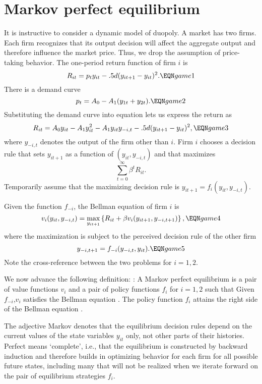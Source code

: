 \section{Markov perfect equilibrium}

It is instructive to consider a dynamic model of duopoly.
A  market has two firms. Each firm recognizes that its
output decision will affect the aggregate output and therefore influence the
market price. Thus, we drop the assumption of price-taking behavior.
The  one-period return
function of firm $i$ is
$$ R_{it} = p_t y_{it} - .5 d (y_{i t+1} - y_{it})^2.  \EQN game1 $$
There is a demand curve
$$ p_t = A_0 - A_1 (y_{1t} +  y_{2t}) .  \EQN game2 $$
Substituting the demand curve into equation  lets us express
the return as
$$ R_{it} = A_0 y_{it} - A_1 y_{it}^2 - A_1 y_{it}y_{-i,t}
     - .5 d (y_{it+1} - y_{it})^2 , \EQN game3 $$
where $y_{-i,t}$ denotes the output of the firm other than $i$.
Firm $i$  chooses a decision rule that sets
$y_{it+1}$ as a function of $(y_{it}, y_{-i,t})$  and that  maximizes
$$ \sum_{t=0}^\infty \beta^t R_{it} .$$
Temporarily assume that  the maximizing
decision rule is $y_{it+1}  = f_i(y_{it}, y_{-i,t})$.


Given the function $f_{-i}$, the Bellman equation
of firm $i$ is
$$ v_i(y_{it}, y_{-i,t}) = \max_{y_{it+1}} \left\{
    R_{it} + \beta v_i(y_{it+1}, y_{-i,t+1}) \right\},  \EQN game4 $$
where the maximization is subject to the perceived
decision rule of the other firm
$$ y_{-i,t+1} = f_{-i}(y_{-i,t}, y_{it}). \EQN game5 $$
Note the cross-reference between the two problems for $i=1,2$.

We now advance  the following definition:
\medskip
{}:
 A Markov perfect equilibrium is a  pair of  value
functions $v_i$ and a pair of policy functions
$f_i$ for $i=1,2$ such that
\medskip
{} Given $f_{-i}$,$v_i$ satisfies
the Bellman equation  .
\medskip
{}  The policy function $f_i$ attains the right side
of the Bellman equation .
\medskip

  The adjective Markov denotes that the equilibrium decision
rules depend on the current values of the state variables
$y_{it}$ only, not other parts of their histories.   Perfect means `complete', i.e., that
the equilibrium is constructed by backward induction and therefore
builds in optimizing behavior for each firm for all possible
future states, including many that will  not be realized when we iterate
 forward on the pair of equilibrium
strategies $f_i$.

